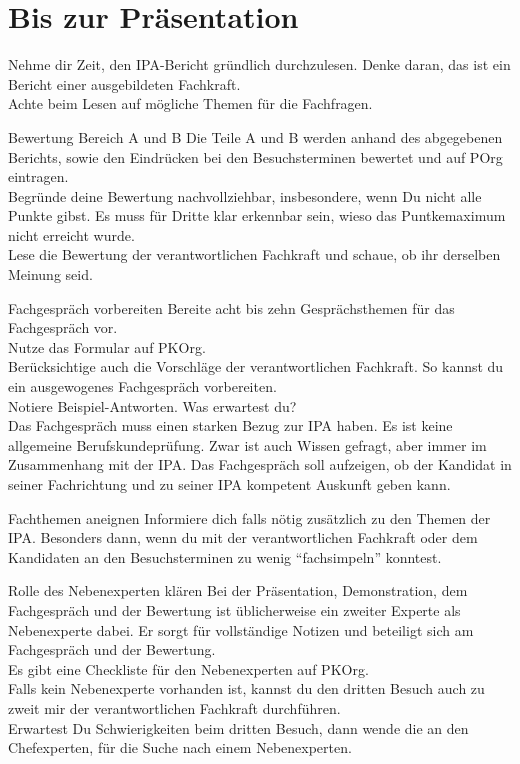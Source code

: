 \section{Bis zur Präsentation}
Nehme dir Zeit, den IPA-Bericht gründlich durchzulesen. Denke daran, das ist ein Bericht einer ausgebildeten Fachkraft.\\Achte beim Lesen auf mögliche Themen für die Fachfragen.

\begin{taskitemwithoutcomment}{Bewertung Bereich A und B}
  Die Teile A und B werden anhand des abgegebenen Berichts, sowie den Eindrücken bei den Besuchsterminen bewertet und auf POrg eintragen.\\Begründe deine Bewertung nachvollziehbar, insbesondere, wenn Du nicht alle Punkte gibst. Es muss für Dritte klar erkennbar sein, wieso das Puntkemaximum nicht erreicht wurde.\\Lese die Bewertung der verantwortlichen Fachkraft und schaue, ob ihr derselben Meinung seid.
\end{taskitemwithoutcomment}
\begin{taskitemwithoutcomment}{Fachgespräch vorbereiten}
  Bereite acht bis zehn Gesprächsthemen für das Fachgespräch vor.\\Nutze das Formular auf PKOrg.\\Berücksichtige auch die Vorschläge der verantwortlichen Fachkraft. So kannst du ein ausgewogenes Fachgespräch vorbereiten.\\Notiere Beispiel-Antworten. Was erwartest du?\\Das Fachgespräch muss einen starken Bezug zur IPA haben. Es ist keine allgemeine Berufskundeprüfung. Zwar ist auch Wissen gefragt, aber immer im Zusammenhang mit der IPA. Das Fachgespräch soll aufzeigen, ob der Kandidat in seiner Fachrichtung und zu seiner IPA kompetent Auskunft geben kann.
\end{taskitemwithoutcomment}
\begin{taskitem}{Fachthemen aneignen}
  Informiere dich falls nötig zusätzlich zu den Themen der IPA. Besonders dann, wenn du mit der verantwortlichen Fachkraft oder dem Kandidaten an den Besuchsterminen zu wenig \enquote{fachsimpeln} konntest.
\end{taskitem}
\begin{taskitemwithoutcomment}{Rolle des Nebenexperten klären}
  Bei der Präsentation, Demonstration, dem Fachgespräch und der Bewertung ist üblicherweise ein zweiter Experte als Nebenexperte dabei. Er sorgt für vollständige Notizen und beteiligt sich am Fachgespräch und der Bewertung.\\Es gibt eine Checkliste für den Nebenexperten auf PKOrg.\\Falls kein Nebenexperte vorhanden ist, kannst du den dritten Besuch auch zu zweit mir der verantwortlichen Fachkraft durchführen.\\Erwartest Du Schwierigkeiten beim dritten Besuch, dann wende die an den Chefexperten, für die Suche nach einem Nebenexperten.
\end{taskitemwithoutcomment}
